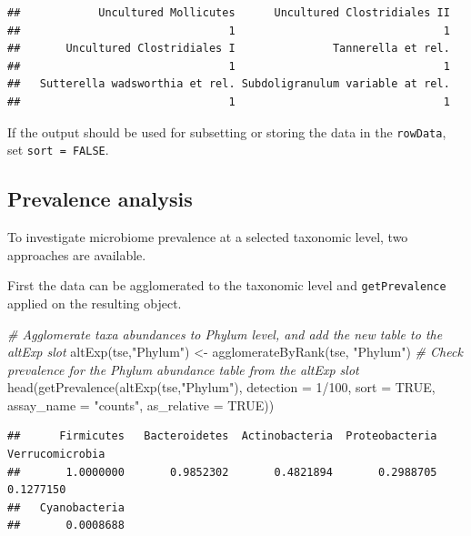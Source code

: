 \documentclass[
]{book}
\newenvironment{Shaded}{\begin{snugshade}}{\end{snugshade}}
\newcommand{\AttributeTok}[1]{\textcolor[rgb]{0.77,0.63,0.00}{#1}}
\newcommand{\CommentTok}[1]{\textcolor[rgb]{0.56,0.35,0.01}{\textit{#1}}}
\newcommand{\ConstantTok}[1]{\textcolor[rgb]{0.00,0.00,0.00}{#1}}
\newcommand{\DecValTok}[1]{\textcolor[rgb]{0.00,0.00,0.81}{#1}}
\newcommand{\FunctionTok}[1]{\textcolor[rgb]{0.00,0.00,0.00}{#1}}
\newcommand{\NormalTok}[1]{#1}
\newcommand{\OtherTok}[1]{\textcolor[rgb]{0.56,0.35,0.01}{#1}}
\newcommand{\SpecialCharTok}[1]{\textcolor[rgb]{0.00,0.00,0.00}{#1}}
\newcommand{\StringTok}[1]{\textcolor[rgb]{0.31,0.60,0.02}{#1}}
\begin{document}
\begin{verbatim}
##            Uncultured Mollicutes      Uncultured Clostridiales II 
##                                1                                1 
##       Uncultured Clostridiales I               Tannerella et rel. 
##                                1                                1 
##   Sutterella wadsworthia et rel. Subdoligranulum variable at rel. 
##                                1                                1
\end{verbatim}

If the output should be used for subsetting or storing the data in the
\texttt{rowData}, set \texttt{sort\ =\ FALSE}.

\hypertarget{prevalence-analysis}{%
\subsection{Prevalence analysis}\label{prevalence-analysis}}

To investigate microbiome prevalence at a selected taxonomic level, two
approaches are available.

First the data can be agglomerated to the taxonomic level and \texttt{getPrevalence}
applied on the resulting object.

\begin{Shaded}
\begin{Highlighting}[]
\CommentTok{\# Agglomerate taxa abundances to Phylum level, and add the new table to the altExp slot}
\FunctionTok{altExp}\NormalTok{(tse,}\StringTok{"Phylum"}\NormalTok{) }\OtherTok{\textless{}{-}} \FunctionTok{agglomerateByRank}\NormalTok{(tse, }\StringTok{"Phylum"}\NormalTok{)}
\CommentTok{\# Check prevalence for the Phylum abundance table from the altExp slot}
\FunctionTok{head}\NormalTok{(}\FunctionTok{getPrevalence}\NormalTok{(}\FunctionTok{altExp}\NormalTok{(tse,}\StringTok{"Phylum"}\NormalTok{), }\AttributeTok{detection =} \DecValTok{1}\SpecialCharTok{/}\DecValTok{100}\NormalTok{, }\AttributeTok{sort =} \ConstantTok{TRUE}\NormalTok{,}
                   \AttributeTok{assay\_name =} \StringTok{"counts"}\NormalTok{, }\AttributeTok{as\_relative =} \ConstantTok{TRUE}\NormalTok{))}
\end{Highlighting}
\end{Shaded}

\begin{verbatim}
##      Firmicutes   Bacteroidetes  Actinobacteria  Proteobacteria Verrucomicrobia 
##       1.0000000       0.9852302       0.4821894       0.2988705       0.1277150 
##   Cyanobacteria 
##       0.0008688
\end{verbatim}
\end{document}
